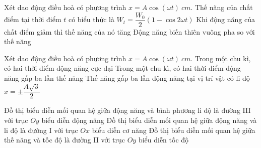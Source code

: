 \begin{ex}%
Xét dao động điều hoà có phương trình $x=A\cos(\omega t)\ cm$.
{Thế năng của chất điểm tại thời điểm $t$ có biểu thức là \linebreak $W_{t}=\dfrac{W_0}{2}(1-\cos 2 \omega t)$}
{\True Khi động năng của chất điểm giảm thì thế năng của nó tăng}
{Động năng biến thiên vuông pha so với thế năng}
\loigiai{
\begin{itemchoice}
\itemch
\itemch
\itemch
\itemch
\end{itemchoice}

}
\end{ex} 
\begin{ex}%
Xét dao động điều hoà có phương trình $x=A\cos(\omega t)\ cm$.
{\True Trong một chu kì, có hai thời điểm động năng cực đại}
{Trong một chu kì, có hai thời điểm động năng gấp ba lần thế năng}
{\True Thế năng gấp ba lần động năng tại vị trí vật có li độ $x=\pm \dfrac{A \sqrt{3}}{2}$}
\loigiai{
\begin{itemchoice}
\itemch
\itemch
\itemch
\itemch
\end{itemchoice}

}
\end{ex} 
\begin{ex}%
{Đồ thị biểu diễn mối quan hệ giữa động năng và bình phương li độ là đường III với trục $O y$ biểu diễn động năng}
{Đồ thị biểu diễn mối quan hệ giữa động năng và li độ là đường I với trục $Ox$ biểu diễn cơ năng}
{Đồ thị biểu diễn mối quan hệ giữa thế năng và tốc độ là đường II với trục $O y$ biểu diễn tốc độ}
\loigiai{
\begin{itemchoice}
\itemch
\itemch
\itemch
\itemch
\end{itemchoice}
}
\end{ex} 

